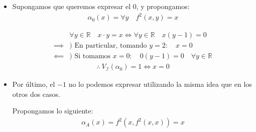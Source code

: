 \begin{itemize}
\begin{itemize}
        Interpretando $\alpha_1$:
        \begin{align*}
            & \forall y \in \mathbb{R} \quad x \cdot y = y 
            \iff \forall y \in \mathbb{R} \quad (x-1) y = 0 \\
            \implies) & \notamath{En particular para $y = 3$}
            3 (x-1) = 0 \\
            &\implies x = 1 \\
            \impliedby) & \notamath{x = 1}
            (1-1) y = 0 \quad \forall y \in \mathbb{R} \\
        \end{align*}
        \begin{gather*}
            \therefore ~ V_{\mathcal{I}, v_{x=1}}(\alpha_1(x)) = 1 \iff x = 1
        \end{gather*}

        Entonces la fórmula $\alpha_1(x)$ expresa $B = \{ 1 \}$. Es decir,
        $B$ es expresable en $\mathcal{I}$.


        No es lo que me pedían en este ejercicio, pero nos damos cuenta que 
        al 1 lo podemos describir de esta forma.


        \item Supongamos que queremos expresar el 0, y propongamos:
        \begin{gather*}
            \alpha_0(x) = \forall y \quad f^2(x,y) = x
        \end{gather*}

        \begin{align*}
            & \forall y \in \mathbb{R} \quad x \cdot y = x \iff \forall y \in
            \mathbb{R} \quad x(y-1) = 0 \\
            \implies & ) \text{ En particular, tomando } y = 2: \quad x = 0 \\
            \impliedby & ) \text{ Si tomamos } x = 0: \quad 0(y-1) = 0 \quad
            \forall y \in \mathbb{R}
        \end{align*}
        \begin{gather*}
            \therefore ~ V_{\mathcal{I}}(\alpha_0) = 1 \iff x = 0
        \end{gather*}


        \item Por último, el $-1$ no lo podemos expresar utilizando la misma 
        idea que en los otros dos casos.

        Propongamos lo siguiente:
        \begin{gather*}
            \alpha_A(x) = f^2 (x, f^2 (x,x)) = x
        \end{gather*}


\end{itemize}
\end{itemize}
